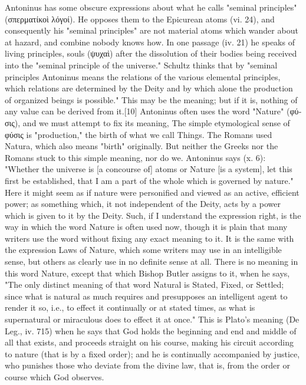 Antoninus has some obscure expressions about what he calls "seminal principles" (\textgreek{σπερματίκοὶ λόγοί}). He opposes them to the Epicurean atoms (vi. 24), and consequently his "seminal principles" are not material atoms which wander about at hazard, and combine nobody knows how. In one passage (iv. 21) he speaks of living principles, souls (\textgreek{ψυχαὶ}) after the dissolution of their bodies being received into the "seminal principle of the universe." Schultz thinks that by "seminal principles Antoninus means the relations of the various elemental principles, which relations are determined by the Deity and by which alone the production of organized beings is possible." This may be the meaning; but if it is, nothing of any value can be derived from it.[10] Antoninus often uses the word "Nature" (\textgreek{φύσις}), and we must attempt to fix its meaning, The simple etymological sense of \textgreek{φύσις} is "production," the birth of what we call Things. The Romans used Natura, which also means "birth" originally. But neither the Greeks nor the Romans stuck to this simple meaning, nor do we. Antoninus says (x. 6): "Whether the universe is [a concourse of] atoms or Nature [is a system], let this first be established, that I am a part of the whole which is governed by nature." Here it might seem as if nature were personified and viewed as an active, efficient power; as something which, it not independent of the Deity, acts by a power which is given to it by the Deity. Such, if I understand the expression right, is the way in which the word Nature is often used now, though it is plain that many writers use the word without fixing any exact meaning to it. It is the same with the expression Laws of Nature, which some writers may use in an intelligible sense, but others as clearly use in no definite sense at all. There is no meaning in this word Nature, except that which Bishop Butler assigns to it, when he says, "The only distinct meaning of that word Natural is Stated, Fixed, or Settled; since what is natural as much requires and presupposes an intelligent agent to render it so, i.e., to effect it continually or at stated times, as what is supernatural or miraculous does to effect it at once." This is Plato's meaning (De Leg., iv. 715) when he says that God holds the beginning and end and middle of all that exists, and proceeds straight on his course, making his circuit according to nature (that is by a fixed order); and he is continually accompanied by justice, who punishes those who deviate from the divine law, that is, from the order or course which God observes.

